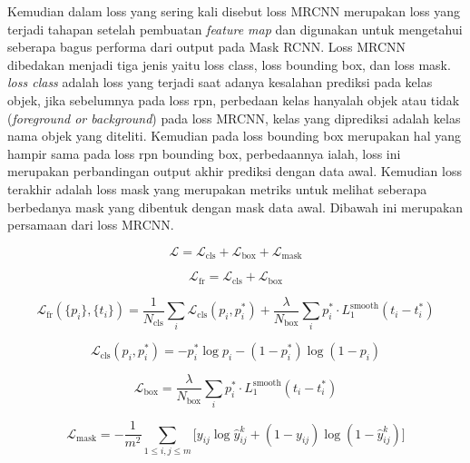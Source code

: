 Kemudian dalam loss yang sering kali disebut loss MRCNN merupakan loss yang terjadi tahapan setelah
pembuatan \textit{feature map} dan digunakan untuk mengetahui seberapa bagus performa dari output
pada Mask RCNN. Loss MRCNN dibedakan menjadi tiga jenis yaitu loss class, loss bounding box, dan loss mask.
\textit{loss class} adalah loss yang terjadi saat adanya kesalahan prediksi pada kelas objek, jika sebelumnya
pada loss rpn, perbedaan kelas hanyalah objek atau tidak (\textit{foreground or background}) pada loss
MRCNN, kelas yang diprediksi adalah kelas nama objek yang diteliti. Kemudian pada loss bounding box
merupakan hal yang hampir sama pada loss rpn bounding box, perbedaannya ialah, loss ini merupakan
perbandingan output akhir prediksi dengan data awal. Kemudian loss terakhir adalah loss mask yang merupakan
metriks untuk melihat seberapa berbedanya mask yang dibentuk dengan mask data awal. Dibawah ini merupakan
persamaan dari loss MRCNN.

\begin{equation}
    \label{eq :loss}
    \mathcal{L} = \mathcal{L}_\text{cls} + \mathcal{L}_\text{box} + \mathcal{L}_\text{mask}
  \end{equation}
  
  \begin{equation}
    \label{eq:other Loss}
    \mathcal{L}_\text{fr} = \mathcal{L}_\text{cls} + \mathcal{L}_\text{box}
  \end{equation}
  
  \begin{equation}
    \mathcal{L}_\text{fr}(\{p_i\}, \{t_i\}) = \frac{1}{N_\text{cls}} \sum_i \mathcal{L}_\text{cls} (p_i, p^*_i) + \frac{\lambda}{N_\text{box}} \sum_i p^*_i \cdot L_1^\text{smooth}(t_i - t^*_i)
  \end{equation}
  
  \begin{equation}
    \label{eq :cls_loss}
    \mathcal{L}_\text{cls} (p_i, p^*_i) = - p^*_i \log p_i - (1 - p^*_i) \log (1 - p_i)
  \end{equation}
  
  \begin{equation}
    \label{eq :bbox loss}
    \mathcal{L}_\text{box} = \frac{\lambda}{N_\text{box}} \sum_i p^*_i \cdot L_1^\text{smooth}(t_i - t^*_i)
  \end{equation}
  
  \begin{equation}
    \label{eq :mask loss}
    \mathcal{L}_\text{mask} = - \frac{1}{m^2} \sum_{1 \leq i, j \leq m} \big[ y_{ij} \log \hat{y}^k_{ij} + (1-y_{ij}) \log (1- \hat{y}^k_{ij}) \big]
\end{equation}

